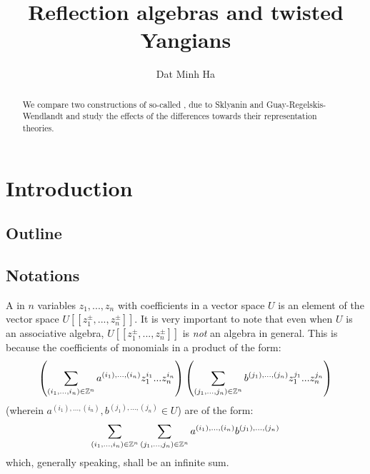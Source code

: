 

\setcounter{section}{-1}





    \title{Reflection algebras and twisted Yangians}
    
    \author{Dat Minh Ha}
    \maketitle
    
    \begin{abstract}
        We compare two constructions of so-called , due to Sklyanin and Guay-Regelskis-Wendlandt and study the effects of the differences towards their representation theories.
    \end{abstract}
    
    {
    \hypersetup{} 
    \tableofcontents %
    }

    \listoftodos

    \section{Introduction}
        \subsection{Outline}

        \subsection{Notations}
            A  in $n$ variables $z_1, ..., z_n$ with coefficients in a vector space $U$ is an element of the vector space $U[\![z_1^{\pm}, ..., z_n^{\pm}]\!]$. It is very important to note that even when $U$ is an associative algebra, $U[\![z_1^{\pm}, ..., z_n^{\pm}]\!]$ is \textit{not} an algebra in general. This is because the coefficients of monomials in a product of the form:
                $$\left( \sum_{(i_1, ..., i_n) \in \mathbb{Z}^n} a^{(i_1), ..., (i_n)} z_1^{i_1} ... z_n^{i_n} \right) \left( \sum_{(j_1, ..., j_n) \in \mathbb{Z}^n} b^{(j_1), ..., (j_n)} z_1^{j_1} ... z_n^{j_n} \right)$$
            (wherein $a^{(i_1), ..., (i_n)}, b^{(j_1), ..., (j_n)} \in U$) are of the form:
                $$\sum_{(i_1, ..., i_n) \in \mathbb{Z}^n} \sum_{(j_1, ..., j_n) \in \mathbb{Z}^n} a^{(i_1), ..., (i_n)} b^{(j_1), ..., (j_n)}$$
            which, generally speaking, shall be an infinite sum.

